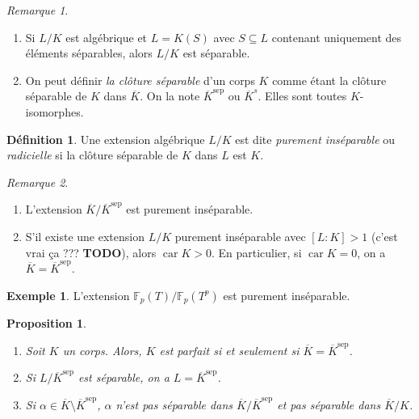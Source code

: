 \documentclass{article}
\newcommand{\sep}{\mathrm{sep}}
\newcommand{\F}{\mathbb{F}}
\DeclareMathOperator{\car}{car}
\newcommand{\todo}{\textbf{TODO}}
\theoremstyle{plain}
\newtheorem{proposition}[theorem]{Proposition}
\theoremstyle{definition}
\newtheorem{definition}[theorem]{Définition}
\newtheorem{example}[theorem]{Exemple}
\theoremstyle{remark}
\newtheorem*{remark}{Remarque}
\begin{document}
\begin{remark} \leavevmode
    \begin{enumerate}
        \item Si $L/K$ est algébrique et $L = K(S)$ avec $S\subseteq L$ contenant uniquement des éléments séparables, alors $L/K$ est séparable.
        \item On peut définir \emph{\og la \fg clôture séparable} d'un corps $K$ comme étant la clôture séparable de $K$ dans $\overline{K}$. On la note $\overline{K}^\sep$ ou $\overline{K}^s$. Elles sont toutes $K$-isomorphes.
    \end{enumerate}
\end{remark}

\begin{definition}
    Une extension algébrique $L/K$ est dite \emph{purement inséparable} ou \emph{radicielle} si la clôture séparable de $K$ dans $L$ est $K$.
\end{definition}

\begin{remark} \leavevmode
   \begin{enumerate}
    \item L'extension $\overline{K}/\overline{K}^\sep$ est purement inséparable.
    \item S'il existe une extension $L/K$ purement inséparable avec $[L : K] > 1$ (c'est vrai ça ??? \todo), alors $\car K > 0$. En particulier, si $\car K = 0$, on a $\overline{K} = \overline{K}^\sep$.
   \end{enumerate} 
\end{remark}

\begin{example}
    L'extension $\F_p(T)/\F_p(T^p)$ est purement inséparable.
\end{example}

\begin{proposition} \leavevmode
    \begin{enumerate}
        \item Soit $K$ un corps. Alors, $K$ est parfait si et seulement si $\overline{K} = \overline{K}^\sep$.
        \item Si $L/\overline{K}^\sep$ est séparable, on a $L=\overline{K}^\sep$.
        \item Si $\alpha \in \overline{K} \setminus \overline{K}^\sep$, $\alpha$ n'est pas séparable dans $\overline{K}/\overline{K}^\sep$ et pas séparable dans $\overline{K}/K$.
    \end{enumerate}
\end{proposition}
\end{document}

